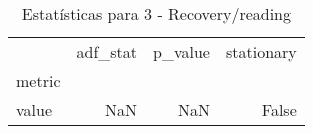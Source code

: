 \begin{table}[htbp]
\caption{Estatísticas para 3 - Recovery/reading}
\label{tab:3_-_recovery_reading_adf_test}
\begin{tabular}{lrrr}
\toprule
 & adf_stat & p_value & stationary \\
metric &  &  &  \\
\midrule
value & NaN & NaN & False \\
\bottomrule
\end{tabular}
\end{table}

